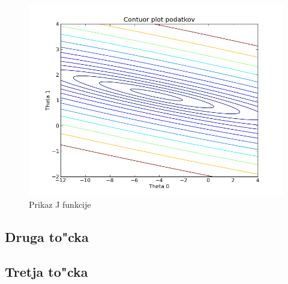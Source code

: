 \documentclass[a4paper,11pt]{article}
\begin{document}
\begin{figure}[H]
\begin{center}
\includegraphics[scale=0.3]{contour.png}
\caption{Prikaz J funkcije}
\end{center}
\label{contour}
\end{figure}


\subsection{Druga to"cka}
\subsection{Tretja to"cka}

%
\end{document}
